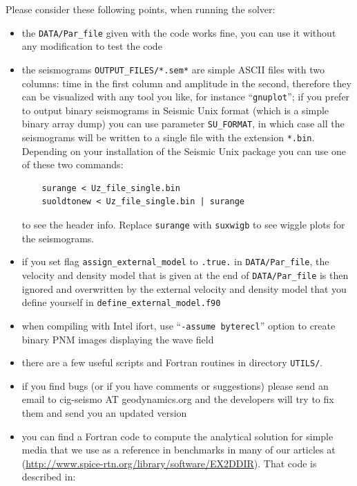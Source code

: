 \documentclass[oneside,english,onecolumn,letterpaper]{book}
\newcommand{\urlwithparentheses}[1]{(\url{#1})}
\begin{document}
Please consider these following points, when running the solver:
%
\begin{itemize}
\item the \texttt{DATA/Par\_file} given with the code works fine, you can use it without any modification to test the code

\item the seismograms \texttt{OUTPUT\_FILES/*.sem*} are simple ASCII files with two columns: time in the first column and amplitude in the second, therefore they can be visualized with any tool you like, for instance ``\texttt{gnuplot}''; if you prefer to output binary seismograms in Seismic Unix format (which is a simple binary array dump) you can use parameter \texttt{SU\_FORMAT}, in which case all the seismograms will be written to a single file with the extension \texttt{*.bin}.
Depending on your installation of the Seismic Unix package you can use one of these two commands:
%
\begin{verbatim}
    surange < Uz_file_single.bin
    suoldtonew < Uz_file_single.bin | surange
\end{verbatim}
%
to see the header info.
Replace \texttt{surange} with \texttt{suxwigb} to see wiggle plots for the seismograms.

\item if you set flag \texttt{assign\_external\_model} to \texttt{.true.} in \texttt{DATA/Par\_file}, the velocity and density model that is given at the end of \texttt{DATA/Par\_file} is then ignored and overwritten by the external velocity and density model that you define yourself in \texttt{define\_external\_model.f90}

\item when compiling with Intel ifort, use ``\texttt{-assume byterecl}'' option to create binary PNM images displaying the wave field

\item there are a few useful scripts and Fortran routines in directory \texttt{UTILS/}.

\item if you find bugs (or if you have comments or suggestions) please send an email to cig-seismo AT geodynamics.org and the developers will try to fix them and send you an updated version

\item you can find a Fortran code to compute the analytical solution for simple media that we use as a reference in benchmarks in many of our articles at
\urlwithparentheses{http://www.spice-rtn.org/library/software/EX2DDIR}. That code is described in: \cite{BeIfNiSk94}

\end{itemize}
\end{document}
